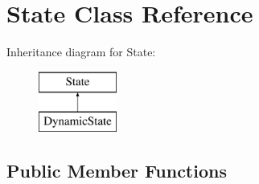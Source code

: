 \section{State Class Reference}
\label{class_state}
Inheritance diagram for State\-:\begin{figure}[H]
\begin{center}
\leavevmode
\includegraphics[height=2.000000cm]{class_state}
\end{center}
\end{figure}
\subsection*{Public Member Functions}
